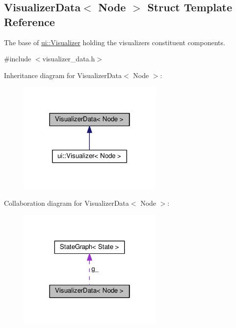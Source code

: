 \hypertarget{structVisualizerData}{}\subsection{Visualizer\+Data$<$ Node $>$ Struct Template Reference}
\label{structVisualizerData}


The base of \hyperlink{structui_1_1Visualizer}{ui\+::\+Visualizer} holding the visualizer\textquotesingle{}s constituent components.  




{\ttfamily \#include $<$visualizer\+\_\+data.\+h$>$}



Inheritance diagram for Visualizer\+Data$<$ Node $>$\+:\nopagebreak
\begin{figure}[H]
\begin{center}
\leavevmode
\includegraphics[width=202pt]{structVisualizerData__inherit__graph}
\end{center}
\end{figure}


Collaboration diagram for Visualizer\+Data$<$ Node $>$\+:\nopagebreak
\begin{figure}[H]
\begin{center}
\leavevmode
\includegraphics[width=202pt]{structVisualizerData__coll__graph}
\end{center}
\end{figure}
